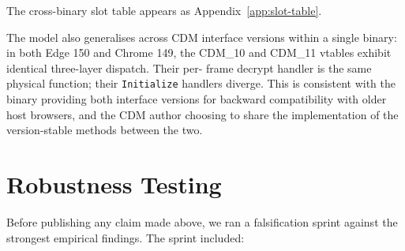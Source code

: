 \documentclass[11pt,letterpaper]{article}
\begin{document}
\noindent The cross-binary slot table appears as
Appendix~\ref{app:slot-table}.

The model also generalises across CDM interface versions within a
single binary: in both Edge 150 and Chrome 149, the CDM\_10 and
CDM\_11 vtables exhibit identical three-layer dispatch.  Their per-
frame decrypt handler is the same physical function; their
\texttt{Initialize} handlers diverge.  This is consistent with the
binary providing both interface versions for backward compatibility
with older host browsers, and the CDM author choosing to share the
implementation of the version-stable methods between the two.

\section{Robustness Testing}
\label{sec:robustness}

Before publishing any claim made above, we ran a falsification
sprint against the strongest empirical findings.  The sprint
included:
\end{document}
